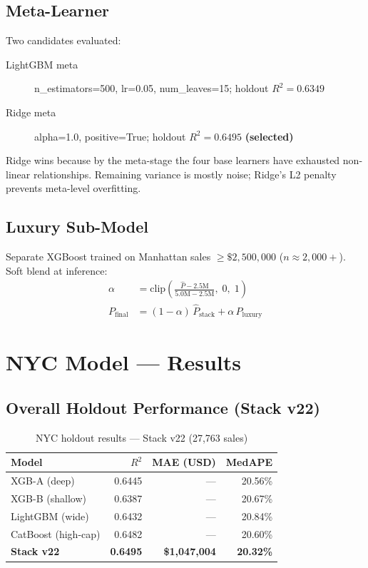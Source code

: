 \documentclass[11pt, a4paper, twoside]{report}
\begin{document}
\section{Meta-Learner}
Two candidates evaluated:
\begin{description}
  \item[LightGBM meta] n\_estimators=500, lr=0.05, num\_leaves=15;
        holdout $R^2 = 0.6349$
  \item[Ridge meta] alpha=1.0, positive=True; holdout $R^2 = 0.6495$
        \textbf{(selected)}
\end{description}
Ridge wins because by the meta-stage the four base learners have exhausted
non-linear relationships. Remaining variance is mostly noise; Ridge's L2
penalty prevents meta-level overfitting.

\section{Luxury Sub-Model}
Separate XGBoost trained on Manhattan sales $\geq \$2{,}500{,}000$ ($n
\approx 2{,}000+$). Soft blend at inference:
\begin{align}
  \alpha &= \text{clip}\!\left(\frac{\hat{P} - 2.5\text{M}}{5.0\text{M} - 2.5\text{M}},\;0,\;1\right) \\
  P_\text{final} &= (1-\alpha)\,\hat{P}_\text{stack} + \alpha\,\hat{P}_\text{luxury}
\end{align}

\chapter{NYC Model --- Results}
\label{ch:nyc_results}

\section{Overall Holdout Performance (Stack v22)}
\begin{table}[H]
  \centering
  \caption{NYC holdout results --- Stack v22 (27,763 sales)}
  \begin{tabular}{lrrr}
    \toprule
    Model & $R^2$ & MAE (USD) & MedAPE \\
    \midrule
    XGB-A (deep)            & 0.6445 & --- & 20.56\% \\
    XGB-B (shallow)         & 0.6387 & --- & 20.67\% \\
    LightGBM (wide)         & 0.6432 & --- & 20.84\% \\
    CatBoost (high-cap)     & 0.6482 & --- & 20.60\% \\
    \textbf{Stack v22}      & \textbf{0.6495} & \textbf{\$1,047,004} & \textbf{20.32\%} \\
    \bottomrule
  \end{tabular}
\end{table}
\end{document}
